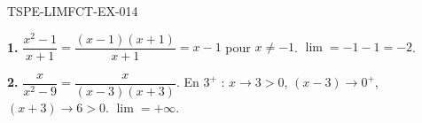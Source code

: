 \begin{corrige}{TSPE-LIMFCT-EX-014}

\textbf{1.} $\dfrac{x^2-1}{x+1} = \dfrac{(x-1)(x+1)}{x+1} = x-1$ pour $x
\neq -1$. $\lim = -1-1 = \boxed{-2}$.

\textbf{2.} $\dfrac{x}{x^2-9} = \dfrac{x}{(x-3)(x+3)}$. En $3^+$ : $x \to 3 > 0$, $(x-3) \to 0^+$, $(x+3) \to 6 > 0$. $\boxed{\lim = +\infty}$.

\end{corrige}
